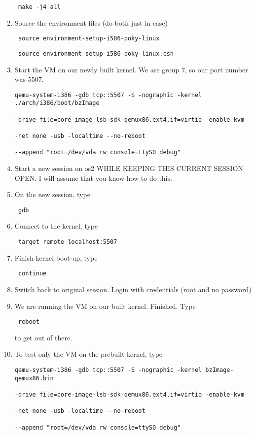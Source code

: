 \documentclass[10pt,english]{article}
\begin{document}
\begin{enumerate}
\begin{verbatim} make -j4 all \end{verbatim}
\item Source the environment files (do both just in case)
\begin{verbatim} source environment-setup-i586-poky-linux \end{verbatim}
\begin{verbatim} source environment-setup-i586-poky-linux.csh \end{verbatim}
\item Start the VM on our newly built kernel. We are group 7, so our port number was 5507.
\begin{verbatim}
qemu-system-i386 -gdb tcp::5507 -S -nographic -kernel ./arch/i386/boot/bzImage 

-drive file=core-image-lsb-sdk-qemux86.ext4,if=virtio -enable-kvm 

-net none -usb -localtime --no-reboot 

--append "root=/dev/vda rw console=ttyS0 debug"    \end{verbatim} 
\item Start a new session on os2 WHILE KEEPING THIS CURRENT SESSION OPEN. I will assume that you know how to do this.
\item On the new session, type \begin{verbatim} gdb \end{verbatim}
\item Connect to the kernel, type \begin{verbatim} target remote localhost:5507 \end{verbatim}
\item Finish kernel boot-up, type \begin{verbatim} continue \end{verbatim}
\item Switch back to original session. Login with credentials (root and no password)
\item We are running the VM on our built kernel. Finished. Type \begin{verbatim} reboot \end{verbatim} to get out of there.
\item To test only the VM on the prebuilt kernel, type

\begin{verbatim}
qemu-system-i386 -gdb tcp::5507 -S -nographic -kernel bzImage-qemux86.bin 

-drive file=core-image-lsb-sdk-qemux86.ext4,if=virtio -enable-kvm 

-net none -usb -localtime --no-reboot 

--append "root=/dev/vda rw console=ttyS0 debug"    \end{verbatim} 
\end{enumerate}
\end{document}
